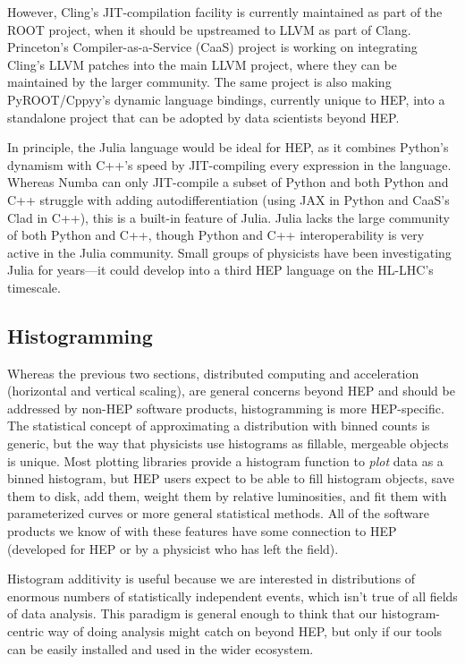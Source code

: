 \documentclass{article}
\begin{document}
However, Cling's JIT-compilation facility is currently maintained as part of the ROOT project, when it should be upstreamed to LLVM as part of Clang. Princeton's Compiler-as-a-Service (CaaS) project is working on integrating Cling's LLVM patches into the main LLVM project, where they can be maintained by the larger community. The same project is also making PyROOT/Cppyy's dynamic language bindings, currently unique to HEP, into a standalone project that can be adopted by data scientists beyond HEP.

In principle, the Julia language would be ideal for HEP, as it combines Python's dynamism with C++'s speed by JIT-compiling every expression in the language. Whereas Numba can only JIT-compile a subset of Python and both Python and C++ struggle with adding autodifferentiation (using JAX in Python and CaaS's Clad in C++), this is a built-in feature of Julia. Julia lacks the large community of both Python and C++, though Python and C++ interoperability is very active in the Julia community. Small groups of physicists have been investigating Julia for years---it could develop into a third HEP language on the HL-LHC's timescale.

\subsection{Histogramming}

Whereas the previous two sections, distributed computing and acceleration (horizontal and vertical scaling), are general concerns beyond HEP and should be addressed by non-HEP software products, histogramming is more HEP-specific. The statistical concept of approximating a distribution with binned counts is generic, but the way that physicists use histograms as fillable, mergeable objects is unique. Most plotting libraries provide a histogram function to {\it plot} data as a binned histogram, but HEP users expect to be able to fill histogram objects, save them to disk, add them, weight them by relative luminosities, and fit them with parameterized curves or more general statistical methods. All of the software products we know of with these features have some connection to HEP (developed for HEP or by a physicist who has left the field).

Histogram additivity is useful because we are interested in distributions of enormous numbers of statistically independent events, which isn't true of all fields of data analysis. This paradigm is general enough to think that our histogram-centric way of doing analysis might catch on beyond HEP, but only if our tools can be easily installed and used in the wider ecosystem.
\end{document}
